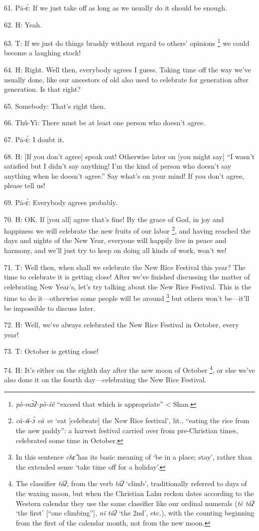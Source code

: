 61. Pā-ɛ́: If we just take off as long as we usually do it should be enough.

62. H: Yeah.

63. T: If we just do things brashly without regard to others' opinions \footnote{\textit{pò-mɔ̀ʔ-pò-šê} ``exceed that which is appropriate'' < Shan.} we
could become a laughing stock!

64. H: Right.  Well then, everybody agrees I guess.  Taking time off the way we've
usually done, like our ancestors of old also used to celebrate for generation after
generation.  Is that right?

65. Somebody: That's right then.

66. Thû-Yì: There must be at least one person who doesn't agree.

67. Pā-ɛ́: I doubt it.

68. H: [If you don't agree] speak out!  Otherwise later on [you might say] ``I
wasn't satisfied but I didn't say anything! I'm the kind of person who doesn't
say anything when he doesn't agree.'' Say what's on your mind!  If you don't agree,
please tell us!

69. Pā-ɛ́: Everybody agrees probably.

70. H: OK. If [you all] agree that's fine!  By the grace of God, in joy and happiness
we will celebrate the new fruits of our labor \footnote{\textit{cà-šɨ-ɔ́ câ ve} `eat [celebrate] the New Rice festival', lit., ``eating the rice from the new paddy'': a harvest festival carried over from pre-Christian times, celebrated some time in October.}, and having reached the days
and nights of the New Year, everyone will happily live in peace and harmony, and
we'll just try to keep on doing all kinds of work, won't we!

71. T: Well then, when shall we celebrate the New Rice Festival this year?  The
time to celebrate it is getting close!  After we've finished discussing the matter
of celebrating New Year's, let's try talking about the New Rice Festival.  This
is the time to do it---otherwise some people will be around \footnote{In this sentence \textit{chɛ̂} has its basic meaning of `be in a place; stay', rather than the extended sense `take time off for a holiday'.} but others won't
be---it'll be impossible to discuss later.

72. H: Well, we've always celebrated the New Rice Festival in October, every year!

73. T: October is getting close!

74. H: It's either on the eighth day after the new moon of October \footnote{The classifier \textit{tâʔ}, from the verb \textit{tâʔ} `climb', traditionally referred to days of the waxing moon, but when the Christian Lahu reckon dates according to the Western calendar they use the same classifier like our ordinal numerals (\textit{tê tâʔ} `the first' [``one climbing''], \textit{nî tâʔ} `the 2nd', etc.), with the counting beginning from the first of the calendar month, not from the new moon.}, or else
we've also done it on the fourth day---celebrating the New Rice Festival.

